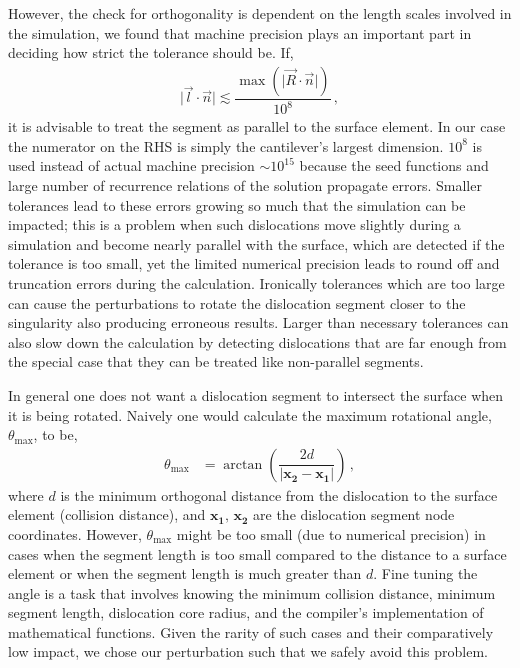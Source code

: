 \documentclass[11pt]{iopart}
\begin{document}
However, the check for orthogonality is dependent on the length scales involved in the simulation, we found that machine precision plays an important part in deciding how strict the tolerance should be. If,
%
\begin{align}
    \lvert\vec{l}\cdot\vec{n}\rvert \lesssim \dfrac{\max\left(\lvert\vec{R}\cdot\vec{n}\rvert\right)}{10^8}\,,
\end{align}
%
it is advisable to treat the segment as parallel to the surface element. In our case the numerator on the RHS is simply the cantilever's largest dimension. $10^8$ is used instead of actual machine precision $\sim10^{15}$ because the seed functions and large number of recurrence relations of the solution propagate errors. Smaller tolerances lead to these errors growing so much that the simulation can be impacted; this is a problem when such dislocations move slightly during a simulation and become nearly parallel with the surface, which are detected if the tolerance is too small, yet the limited numerical precision leads to round off and truncation errors during the calculation. Ironically tolerances which are too large can cause the perturbations to rotate the dislocation segment closer to the singularity also producing erroneous results. Larger than necessary tolerances can also slow down the calculation by detecting dislocations that are far enough from the special case that they can be treated like non-parallel segments.


In general one does not want a dislocation segment to intersect the surface when it is being rotated. Naively one would calculate the maximum rotational angle, $\theta_{\textrm{max}}$, to be,
%
\begin{align}
    \theta_{\textrm{max}} & = \arctan\left(\dfrac{2 d}{\left\lvert\mathbf{x_2} - \mathbf{x_1}\right\rvert}\right)\,,
\end{align}
%
where $d$ is the minimum orthogonal distance from the dislocation to the surface element (collision distance), and $\mathbf{x_1},\,\mathbf{x_2}$ are the dislocation segment node coordinates. However, $\theta_\textrm{max}$ might be too small (due to numerical precision) in cases when the segment length is too small compared to the distance to a surface element or when the segment length is much greater than $d$. Fine tuning the angle is a task that involves knowing the minimum collision distance, minimum segment length, dislocation core radius, and the compiler's implementation of mathematical functions. Given the rarity of such cases and their comparatively low impact, we chose our perturbation such that we safely avoid this problem.
\end{document}
